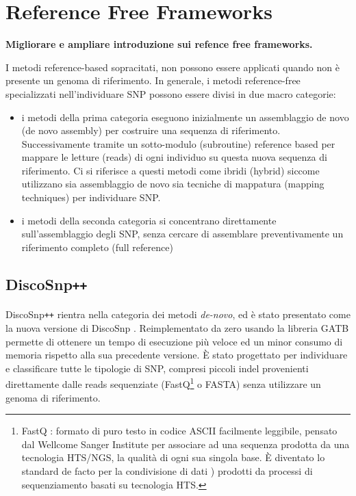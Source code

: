 \documentclass[../main.tex]{subfiles}
\begin{document}
\section{Reference Free Frameworks}
\begin{flushleft}
\textbf{Migliorare e ampliare introduzione sui refence free frameworks.}
\linebreak
\end{flushleft}
I metodi reference-based sopracitati, non possono essere applicati quando non è presente un genoma di riferimento. 
In generale, i metodi reference-free specializzati nell’individuare SNP possono essere divisi in due macro categorie: 
\begin{itemize} 
\item i metodi della prima categoria eseguono inizialmente un assemblaggio de novo (de novo assembly) per costruire una sequenza di riferimento. Successivamente tramite un sotto-modulo (subroutine) reference based per mappare le letture (reads) di ogni individuo su questa nuova sequenza di riferimento. Ci si riferisce a questi metodi come ibridi (hybrid) siccome utilizzano sia assemblaggio de novo sia tecniche di mappatura (mapping techniques) per individuare SNP.
\item i metodi della seconda categoria si concentrano direttamente sull’assemblaggio degli SNP, senza cercare di assemblare preventivamente un riferimento completo (full reference)
\end{itemize}

\subsection{DiscoSnp\texttt{++}}
\paragraph{}
DiscoSnp\texttt{++} \cite{peterlongo2017discosnp++} rientra nella categoria dei metodi \textit{de-novo}, ed è stato presentato come la nuova versione di DiscoSnp \cite{uricaru2015reference}. Reimplementato da zero usando la libreria GATB \cite{drezen2014gatb} permette di ottenere un tempo di esecuzione più veloce ed un minor consumo di memoria rispetto alla sua precedente versione. È stato progettato per individuare e classificare tutte le tipologie di SNP, compresi piccoli indel provenienti direttamente dalle reads sequenziate (FastQ\footnote{FastQ :  formato di puro testo in codice ASCII facilmente leggibile, pensato dal Wellcome Sanger Institute per associare ad una sequenza prodotta da una tecnologia HTS/NGS, la qualità di ogni sua singola base. È diventato lo standard de facto per la condivisione di dati \cite{cock2010sanger}) prodotti da processi di sequenziamento basati su tecnologia HTS. } o FASTA) senza utilizzare un genoma di riferimento.
\end{document}
